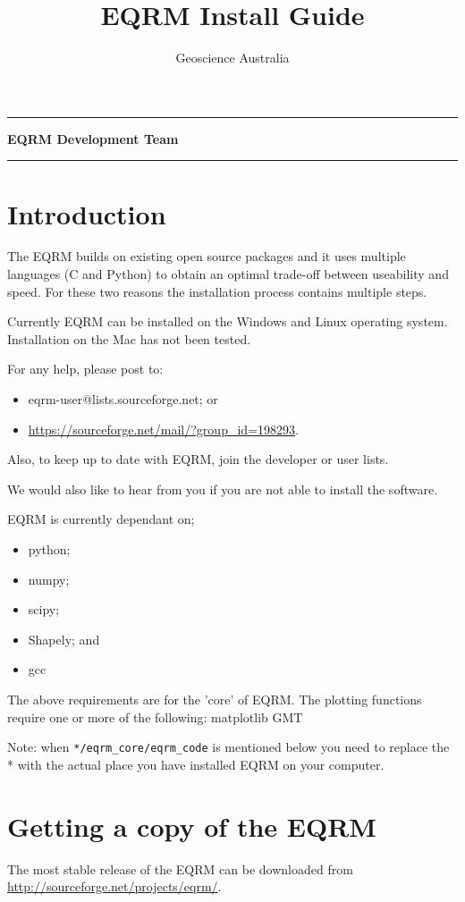 \documentclass[a4paper, 12pt]{article}
\title{EQRM Install Guide}
\author{Geoscience Australia}
\makeatletter
\def\maketitle{%
\null
\thispagestyle{empty}%
\hrule height 0.5pt \vskip 2.5cm
\begin{center}
\normalfont
{\Large \textbf\@title\par}%
\vskip 2.5cm \normalsize \textbf{EQRM Development Team} \vskip 2.5cm
{\normalsize \textbf \@author\par}%
\vskip 4.53cm
{\normalsize \textbf \@date\par}%
\vskip 3.5cm \hrule height 0.5pt
\end{center}%
\null \clearpage }
\makeatother
\begin{document}
\maketitle

\section{Introduction}

The EQRM builds on existing open source packages and it uses
multiple languages (C and Python) to obtain an optimal trade-off
between useability and speed. For these two reasons the installation
process contains multiple steps.

Currently EQRM can be installed on the Windows and Linux operating
system. Installation on the Mac has not been tested.

For any help, please post to:
\begin{itemize}
\item eqrm-user@lists.sourceforge.net; or
\item \url{https://sourceforge.net/mail/?group_id=198293}.
\end{itemize}
Also, to keep up to date with EQRM, join the developer or user
lists.

We would also like to hear from you if you are not able to install
the software.

EQRM is currently dependant on;
\begin{itemize}
\item python;
\item numpy;
\item scipy;
\item Shapely; and
\item gcc
\end{itemize}

The above requirements are for the 'core' of EQRM. The plotting
functions require one or more of the following: matplotlib GMT

Note: when \texttt{*/eqrm\_core/eqrm\_code} is mentioned below you
need to replace the * with the actual place you have installed EQRM
on your computer.

\section{Getting a copy of the EQRM}

The most stable release of the EQRM can be downloaded from \\
\url{http://sourceforge.net/projects/eqrm/}.
\end{document}
